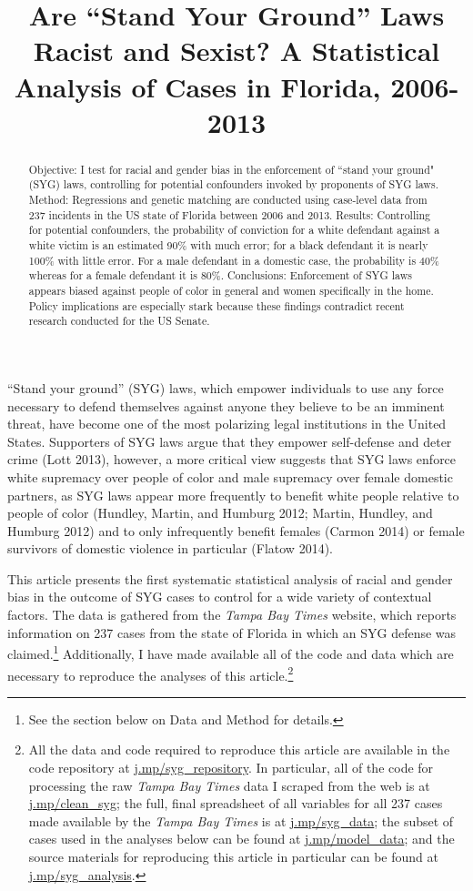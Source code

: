 \documentclass[12pt,article]{article}
\title{Are ``Stand Your Ground'' Laws Racist and Sexist? A Statistical Analysis
of Cases in Florida, 2006-2013}
\author{}
\date{}
\begin{document}
\maketitle


\begin{abstract}
Objective: I test for racial and gender bias in the enforcement of ``stand your ground" (SYG) laws, controlling for potential confounders invoked by proponents of SYG laws. Method: Regressions and genetic matching are conducted using case-level data from 237 incidents in the US state of Florida between 2006 and 2013. Results: Controlling for potential confounders, the probability of conviction for a white defendant against a white victim is an estimated 90\% with much error; for a black defendant it is nearly 100\% with little error. For a male defendant in a domestic case, the probability is 40\% whereas for a female defendant it is 80\%. Conclusions: Enforcement of SYG laws appears biased against people of color in general and women specifically in the home. Policy implications are especially stark because these findings contradict recent research conducted for the US Senate.\end{abstract}
\doublespacing

``Stand your ground'' (SYG) laws, which empower individuals to use any
force necessary to defend themselves against anyone they believe to be
an imminent threat, have become one of the most polarizing legal
institutions in the United States. Supporters of SYG laws argue that
they empower self-defense and deter crime (Lott 2013), however, a more
critical view suggests that SYG laws enforce white supremacy over people
of color and male supremacy over female domestic partners, as SYG laws
appear more frequently to benefit white people relative to people of
color (Hundley, Martin, and Humburg 2012; Martin, Hundley, and Humburg
2012) and to only infrequently benefit females (Carmon 2014) or female
survivors of domestic violence in particular (Flatow 2014).

This article presents the first systematic statistical analysis of
racial and gender bias in the outcome of SYG cases to control for a wide
variety of contextual factors. The data is gathered from the \emph{Tampa
Bay Times} website, which reports information on 237 cases from the
state of Florida in which an SYG defense was claimed.\footnote{See the
  section below on Data and Method for details.} Additionally, I have
made available all of the code and data which are necessary to reproduce
the analyses of this article.\footnote{All the data and code required to
  reproduce this article are available in the code repository at
  \href{http://j.mp/syg_repository}{j.mp/syg\_repository}. In
  particular, all of the code for processing the raw \emph{Tampa Bay
  Times} data I scraped from the web is at
  \href{http://j.mp/clean_syg}{j.mp/clean\_syg}; the full, final
  spreadsheet of all variables for all 237 cases made available by the
  \emph{Tampa Bay Times} is at
  \href{http://j.mp/syg_data}{j.mp/syg\_data}; the subset of cases used
  in the analyses below can be found at
  \href{http://j.mp/model_data}{j.mp/model\_data}; and the source
  materials for reproducing this article in particular can be found at
  \href{http://j.mp/syg_analysis}{j.mp/syg\_analysis}.}
\end{document}
